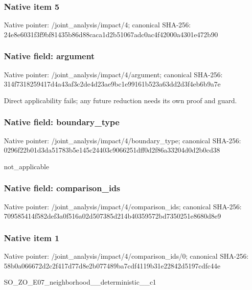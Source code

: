 \documentclass[10pt,a4paper]{article}
\begin{document}
\subsubsection{Native item 5}
Native pointer: /joint\_\allowbreak{}analysis/impact/4; canonical SHA-256: 24e8e6031f3f9bf81435b86d88caca1d2b51067adc0ac4f42000a4301e472b90

\subsubsection{Native field: argument}
Native pointer: /joint\_\allowbreak{}analysis/impact/4/argument; canonical SHA-256: 314f7318259417d4a43af3c2de4d23ae9bc1e99161b523a63dd2d3f4eb6b9a7e

\begingroup\raggedright\sloppy Direct applicability fails;\allowbreak{} any future reduction needs its own proof and guard.\par\endgroup

\subsubsection{Native field: boundary\_\allowbreak{}type}
Native pointer: /joint\_\allowbreak{}analysis/impact/4/boundary\_\allowbreak{}type; canonical SHA-256: 0296f22b01d3da51783b5e145c24403c9066251dff0d2f86a33204d0d2b0cd38

\begingroup\raggedright\sloppy not\_\allowbreak{}applicable\par\endgroup

\subsubsection{Native field: comparison\_\allowbreak{}ids}
Native pointer: /joint\_\allowbreak{}analysis/impact/4/comparison\_\allowbreak{}ids; canonical SHA-256: 709585414f582def3a0f516a02d507385d214b40359572bd7350251e8680d8e9

\subsubsection{Native item 1}
Native pointer: /joint\_\allowbreak{}analysis/impact/4/comparison\_\allowbreak{}ids/0; canonical SHA-256: 58b0a066672d2c2f417d77d8e2b077489ba7cdf4119b31e22842d5197cdfc44e

\begingroup\raggedright\sloppy SO\_\allowbreak{}ZO\_\allowbreak{}E07\_\allowbreak{}neighborhood\_\allowbreak{}\_\allowbreak{}deterministic\_\allowbreak{}\_\allowbreak{}c1\par\endgroup
\end{document}
